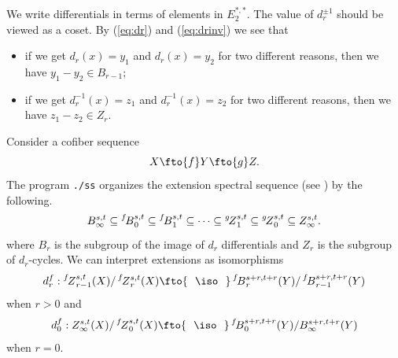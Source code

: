 \documentclass{amsart}
\numberwithin{equation}{section}
\newcommand{\ZESS}[1]{\prescript{#1\!}{}{Z}}
\newcommand{\BESS}[1]{\prescript{#1\!}{}{B}}
\begin{document}
\begin{table}\caption{$E_2^{*,*}(S^0)$ =123}\label{tb:dabf1541}
\end{table}

We write differentials in terms of elements in $E_2^{*,*}$. The value of $d_r^{\pm 1}$ should be viewed as a coset. By (\ref{eq:dr}) and (\ref{eq:drinv}) we see that
\begin{itemize}
    \item if we get $d_r(x)=y_1$ and $d_r(x)=y_2$ for two different reasons, then we have $y_1-y_2\in B_{r-1}$;
    \item if we get $d_r^{-1}(x)=z_1$ and $d_r^{-1}(x)=z_2$ for two different reasons, then we have $z_1-z_2\in Z_r$.
\end{itemize}

Consider a cofiber sequence
$$X\fto{f} Y\fto{g} Z.$$
The program \texttt{./ss} organizes the extension spectral sequence (see \cite{LWX126}) by the following.
$${B}_\infty^{s,t}\subseteq \BESS{f}_0^{s,t}\subseteq \BESS{f}_1^{s,t}\subseteq \cdots \subseteq \ZESS{g}_1^{s,t} \subseteq \ZESS{g}_0^{s,t} \subseteq {Z}_\infty^{s,t}.$$
where $B_r$ is the subgroup of the image of $d_r$ differentials and $Z_r$ is the subgroup of $d_r$-cycles. We can interpret extensions as isomorphisms
\begin{equation}\label{eq:drf}
    d_r^f: \ZESS{f}_{r-1}^{s,t}(X)/\ZESS{f}_r^{s,t}(X)\fto{~~\iso~~} \BESS{f}_r^{s+r,t+r}(Y)/\BESS{f}_{r-1}^{s+r,t+r}(Y)
\end{equation}
when $r>0$ and
\begin{equation}\label{eq:drfinv}
    d_0^f: Z_\infty^{s,t}(X)/\ZESS{f}_0^{s,t}(X)\fto{~~\iso~~} \BESS{f}_0^{s+r,t+r}(Y)/B_{\infty}^{s+r,t+r}(Y)
\end{equation}
when $r=0$.
\end{document}
